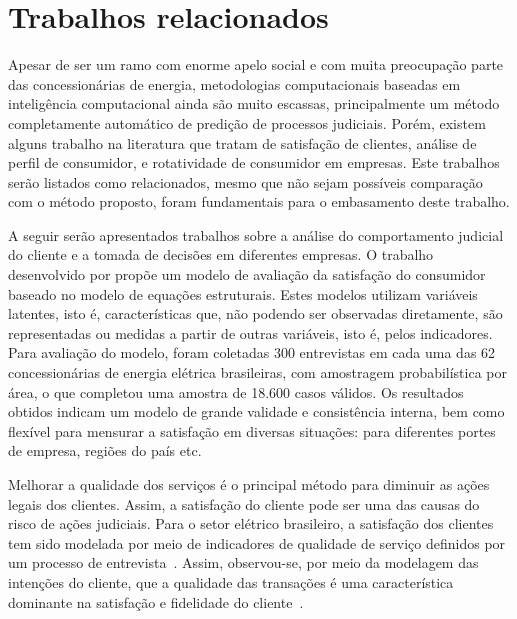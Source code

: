 \documentclass[../main.tex]{subfiles}
\begin{document}
\chapter{Trabalhos relacionados}

Apesar de ser um ramo com enorme apelo social e com muita preocupação parte das concessionárias de energia, metodologias computacionais baseadas em inteligência computacional ainda são muito escassas, principalmente um método completamente automático de predição de processos judiciais. Porém, existem alguns trabalho na literatura que tratam de satisfação de clientes, análise de perfil de consumidor, e rotatividade de consumidor em empresas. Este trabalhos serão listados como relacionados, mesmo que não sejam possíveis comparação com o método proposto, foram fundamentais para o embasamento deste trabalho. 

A seguir serão apresentados  trabalhos sobre a análise do comportamento judicial do cliente e a tomada de decisões em diferentes empresas. O trabalho desenvolvido por  propõe um modelo de avaliação da satisfação do consumidor baseado no modelo de equações estruturais. Estes modelos utilizam variáveis latentes, isto é, características que, não podendo ser observadas diretamente, são representadas ou medidas a partir de outras variáveis, isto é, pelos indicadores. Para avaliação do modelo, foram coletadas 300 entrevistas em cada uma das 62 concessionárias de energia elétrica brasileiras, com amostragem probabilística por área, o que completou uma amostra de 18.600 casos válidos. Os resultados obtidos indicam um modelo de grande validade e consistência interna, bem como flexível para mensurar a satisfação em diversas situações: para diferentes portes de empresa, regiões do país etc.

Melhorar a qualidade dos serviços é o principal método para diminuir as ações legais dos clientes. Assim, a satisfação do cliente pode ser uma das causas do risco de ações judiciais. Para o setor elétrico brasileiro, a satisfação dos clientes tem sido modelada por meio de indicadores de qualidade de serviço definidos por um processo de entrevista~. Assim, observou-se, por meio da modelagem das intenções do cliente, que a qualidade das transações é uma característica dominante na satisfação e fidelidade do cliente~.
\end{document}
